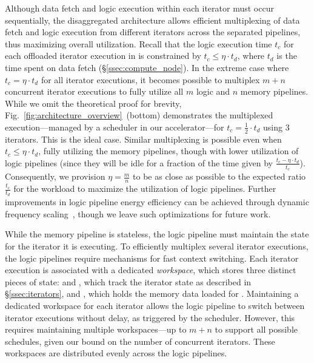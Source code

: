 Although data fetch and logic execution within each iterator must occur sequentially, the disaggregated architecture allows efficient multiplexing of data fetch and logic execution from different iterators across the separated pipelines, thus maximizing overall utilization. Recall that the logic execution time $t_c$ for each offloaded iterator execution in \pulse is constrained by $t_c \leq \eta \cdot t_d$, where $t_d$ is the time spent on data fetch (\S\ref{ssec:compute_node}). In the extreme case where $t_c = \eta \cdot t_d$ for all iterator executions, it becomes possible to multiplex $m+n$ concurrent iterator executions to fully utilize all $m$ logic and $n$ memory pipelines. While we omit the theoretical proof for brevity, Fig.~\ref{fig:architecture_overview}~(bottom) demonstrates the multiplexed execution—managed by a scheduler in our accelerator—for $t_c = \frac{1}{2} \cdot t_d$ using 3 iterators. This is the ideal case. Similar multiplexing is possible even when $t_c \leq \eta \cdot t_d$, fully utilizing the memory pipelines, though with lower utilization of logic pipelines (since they will be idle for a fraction of the time given by $\frac{t_c - \eta \cdot t_d}{t_c}$). Consequently, we provision $\eta = \frac{m}{n}$ to be as close as possible to the expected ratio $\frac{t_c}{t_d}$ for the workload to maximize the utilization of logic pipelines. Further improvements in logic pipeline energy efficiency can be achieved through dynamic frequency scaling~\cite{daepowerscaling}, though we leave such optimizations for future work.

While the memory pipeline is stateless, the logic pipeline must maintain the state for the iterator it is executing. To efficiently multiplex several iterator executions, the logic pipelines require mechanisms for fast context switching. Each iterator execution is associated with a dedicated \emph{workspace}, which stores three distinct pieces of state:  and , which track the iterator state as described in \S\ref{ssec:iterators}, and , which holds the memory data loaded for . Maintaining a dedicated workspace for each iterator allows the logic pipeline to switch between iterator executions without delay, as triggered by the scheduler. However, this requires maintaining multiple workspaces—up to $m+n$ to support all possible schedules, given our bound on the number of concurrent iterators. These workspaces are distributed evenly across the logic pipelines.




